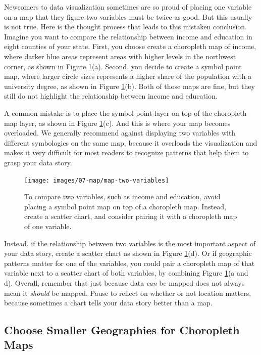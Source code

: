 \documentclass[
  english,
]{book}
\begin{document}
Newcomers to data visualization sometimes are so proud of placing one variable on a map that they figure two variables must be twice as good. But this usually is not true. Here is the thought process that leads to this mistaken conclusion. Imagine you want to compare the relationship between income and education in eight counties of your state. First, you choose create a choropleth map of income, where darker blue areas represent areas with higher levels in the northwest corner, as shown in Figure \ref{fig:map-two-variables}(a). Second, you decide to create a symbol point map, where larger circle sizes represents a higher share of the population with a university degree, as shown in Figure \ref{fig:map-two-variables}(b). Both of those maps are fine, but they still do not highlight the relationship between income and education.

A common mistake is to place the symbol point layer on top of the choropleth map layer, as shown in Figure \ref{fig:map-two-variables}(c). And this is where your map becomes overloaded. We generally recommend against displaying two variables with different symbologies on the same map, because it overloads the visualization and makes it very difficult for most readers to recognize patterns that help them to grasp your data story.



\begin{figure}
\texttt{[image: images/07-map/map-two-variables]} \caption{To compare two variables, such as income and education, avoid placing a symbol point map on top of a choropleth map. Instead, create a scatter chart, and consider pairing it with a choropleth map of one variable.}\label{fig:map-two-variables}
\end{figure}

Instead, if the relationship between two variables is the most important aspect of your data story, create a scatter chart as shown in Figure \ref{fig:map-two-variables}(d). Or if geographic patterns matter for one of the variables, you could pair a choropleth map of that variable next to a scatter chart of both variables, by combining Figure \ref{fig:map-two-variables}(a and d). Overall, remember that just because data \emph{can} be mapped does not always mean it \emph{should} be mapped. Pause to reflect on whether or not location matters, because sometimes a chart tells your data story better than a map.

\hypertarget{choose-smaller-geographies-for-choropleth-maps}{%
\subsection*{Choose Smaller Geographies for Choropleth Maps}\label{choose-smaller-geographies-for-choropleth-maps}}
\end{document}
